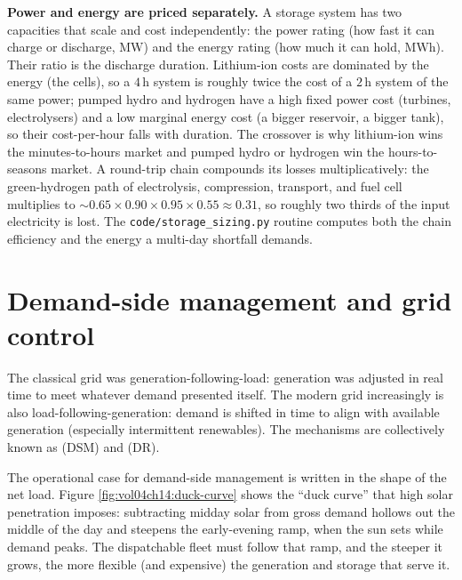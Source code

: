 \begin{mastery}
\textbf{Power and energy are priced separately.} A storage system has
two capacities that scale and cost independently: the power rating
(how fast it can charge or discharge, $\si{\mega\watt}$) and the energy
rating (how much it can hold, $\si{\mega\watt\hour}$). Their ratio is
the discharge duration. Lithium-ion costs are dominated by the energy
(the cells), so a $4\,\si{\hour}$ system is roughly twice the cost of a
$2\,\si{\hour}$ system of the same power; pumped hydro and hydrogen
have a high fixed power cost (turbines, electrolysers) and a low
marginal energy cost (a bigger reservoir, a bigger tank), so their
cost-per-hour falls with duration. The crossover is why lithium-ion
wins the minutes-to-hours market and pumped hydro or hydrogen win the
hours-to-seasons market. A round-trip chain compounds its losses
multiplicatively: the green-hydrogen path of electrolysis,
compression, transport, and fuel cell multiplies to $\sim 0.65 \times
0.90 \times 0.95 \times 0.55 \approx 0.31$, so roughly two thirds of
the input electricity is lost. The \texttt{code/storage\_sizing.py}
routine computes both the chain efficiency and the energy a multi-day
shortfall demands.
\end{mastery}

\section{Demand-side management and grid control}

The classical grid was generation-following-load: generation was
adjusted in real time to meet whatever demand presented itself. The
modern grid increasingly is also load-following-generation: demand is
shifted in time to align with available generation (especially
intermittent renewables). The mechanisms are collectively known as
 (DSM) and 
(DR).



The operational case for demand-side management is written in the shape
of the net load. Figure \ref{fig:vol04ch14:duck-curve} shows the
``duck curve'' that high solar penetration imposes: subtracting midday
solar from gross demand hollows out the middle of the day and steepens
the early-evening ramp, when the sun sets while demand peaks. The
dispatchable fleet must follow that ramp, and the steeper it grows, the
more flexible (and expensive) the generation and storage that serve it.

